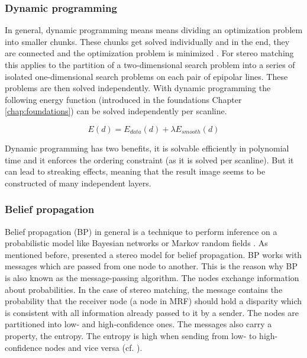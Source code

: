 \subsubsection{Dynamic programming}

In general, dynamic programming means means dividing an optimization problem into smaller chunks.
These chunks get solved individually and in the end, they are connected and the optimization problem is minimized \citep{angel1972dynamic, bellman2015applied, cyganek2011introduction}.
For stereo matching this applies to the partition of a two-dimensional search problem into a series of isolated one-dimensional search problems on each pair of epipolar lines.
These problems are then solved independently.
With dynamic programming the following energy function (introduced in the foundations Chapter \ref{chap:foundations}) can be solved independently per scanline.

\begin{equation}
  E(d) = E_{data}(d) + \lambda E_{smooth}(d)
\end{equation}

\noindent Dynamic programming has two benefits, it is solvable efficiently in polynomial time and it enforces the ordering constraint (as it is solved per scanline).
But it can lead to streaking effects, meaning that the result image seems to be constructed of many independent layers.

\subsubsection{Belief propagation}

Belief propagation (BP) in general is a technique to perform inference on a probabilistic model like Bayesian networks or Markov random fields \citep{yedidia2003understanding, tappen2003comparison, cyganek2011introduction}.
As mentioned before, \citeauthor{sun2003stereo} presented a stereo model for belief propagation.
BP works with messages which are passed from one node to another.
This is the reason why BP is also known as the message-passing algorithm.
The nodes exchange information about probabilities.
In the case of stereo matching, the message contains the probability that the receiver node (a node in MRF) should hold a disparity which is consistent with all information already passed to it by a sender.
The nodes are partitioned into low- and high-confidence ones.
The messages also carry a property, the entropy.
The entropy is high when sending from low- to high-confidence nodes and vice versa (cf. \citep{yedidia2003understanding, tappen2003comparison, cyganek2011introduction}).

